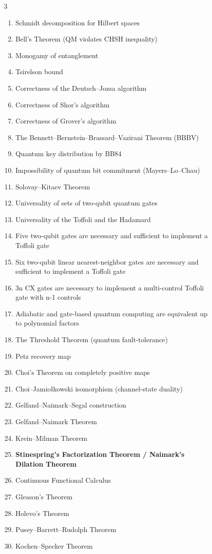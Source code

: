 \begin{figure}
\begin{multicols}{3}
{\begin{enumerate}
\item Schmidt decomposition for Hilbert spaces
\item Bell’s Theorem (QM violates CHSH inequality)
\item Monogamy of entanglement
\item Tsirelson bound
\item Correctness of the Deutsch–Jozsa algorithm
\item Correctness of Shor’s algorithm
\item Correctness of Grover’s algorithm
\item The Bennett–Bernstein–Brassard–Vazirani Theorem (BBBV)
\item Quantum key distribution by BB84
\item Impossibility of quantum bit commitment (Mayers–Lo–Chau)
\item Solovay–Kitaev Theorem
\item Universality of sets of two-qubit quantum gates
\item Universality of the Toffoli and the Hadamard
\item Five two-qubit gates are necessary and sufficient to implement a Toffoli gate
\item Six two-qubit linear nearest-neighbor gates are necessary and sufficient to implement a Toffoli gate
\item 3n CX gates are necessary to implement a multi-control Toffoli gate with n-1 controls
\item Adiabatic and gate-based quantum computing are equivalent up to polynomial factors
\item The Threshold Theorem (quantum fault-tolerance)
\item Petz recovery map
\item Choi’s Theorem on completely positive maps
\item Choi–Jamiołkowski isomorphism (channel-state duality)
\item Gelfand–Naimark–Segal construction
\item Gelfand–Naimark Theorem
\item Krein–Milman Theorem
\item \textbf{Stinespring’s Factorization Theorem / Naimark’s Dilation Theorem}
\item Continuous Functional Calculus
\item Gleason’s Theorem
\item Holevo’s Theorem
\item Pusey–Barrett–Rudolph Theorem
\item Kochen–Specker Theorem

\end{enumerate}}
\end{multicols}
\end{figure}
